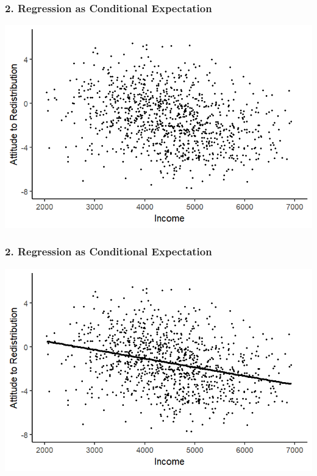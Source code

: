 \documentclass[xcolor=x11names,compress]{beamer}\usepackage[]{graphicx}\usepackage[]{color}
\makeatletter
\def\maxwidth{ %
  \ifdim\Gin@nat@width>\linewidth
    \linewidth
  \else
    \Gin@nat@width
  \fi
}
\newenvironment{knitrout}{}{} %
\renewcommand{\(}{\begin{columns}}
\renewcommand{\)}{\end{columns}}
\newcommand{\<}[1]{\begin{column}{#1}}
\renewcommand{\>}{\end{column}}
\makeatother
\begin{document}
\begin{frame}
\frametitle{2. Regression as Conditional Expectation}
\begin{knitrout}
\color{fgcolor}
\includegraphics[width=\maxwidth]{figure/cond_exp1a-1} 

\end{knitrout}
\end{frame}

\begin{frame}
\frametitle{2. Regression as Conditional Expectation}
\begin{knitrout}
\color{fgcolor}
\includegraphics[width=\maxwidth]{figure/cond_exp1b-1} 

\end{knitrout}
\end{frame}
\end{document}

